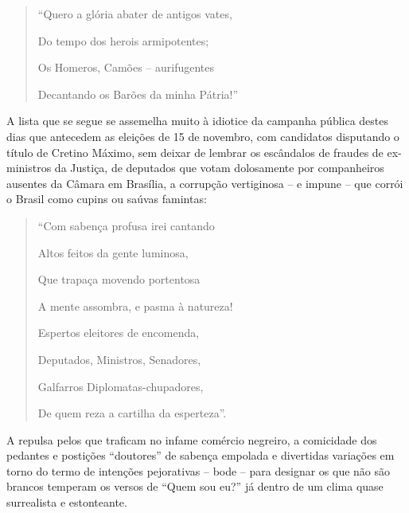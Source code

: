 \documentclass[
  letterpaper,
  DIV=11,
  numbers=noendperiod]{scrreprt}
\begin{document}
\begin{quote}
``Quero a glória abater de antigos vates,~

Do tempo dos herois armipotentes;~

Os Homeros, Camões -- aurifugentes~

Decantando os Barões da minha Pátria!''
\end{quote}

A lista que se segue se assemelha muito à idiotice da campanha pública
destes dias que antecedem as eleições de 15 de novembro, com candidatos
disputando o título de Cretino Máximo, sem deixar de lembrar os
escândalos de fraudes de ex-ministros da Justiça, de deputados que votam
dolosamente por companheiros ausentes da Câmara em Brasília, a corrupção
vertiginosa -- e impune -- que corrói o Brasil como cupins ou saúvas
famintas:

\begin{quote}
``Com sabença profusa irei cantando~

Altos feitos da gente luminosa,~

Que trapaça movendo portentosa~

A mente assombra, e pasma à natureza!~

Espertos eleitores de encomenda,~

Deputados, Ministros, Senadores,~

Galfarros Diplomatas-chupadores,~

De quem reza a cartilha da esperteza''.
\end{quote}

A repulsa pelos que traficam no infame comércio negreiro, a comicidade
dos pedantes e postições ``doutores'' de sabença empolada e divertidas
variações em torno do termo de intenções pejorativas -- bode -- para
designar os que não são brancos temperam os versos de ``Quem sou eu?''
já dentro de um clima quase surrealista e estonteante.
\end{document}
